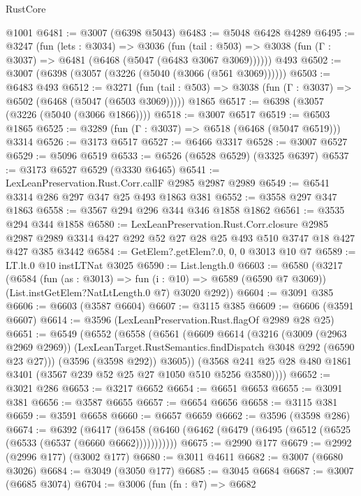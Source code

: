 \begin{lexlean}{RustCore}
\begin{coremodule}
    @1001
@6481 := @3007 (@6398 @5043)
@6483 := @5048 @6428 @4289
@6495 := @3247
    (fun (lets : @3034) =>
    @3036
      (fun (tail : @503) => @3038 (fun (Γ : @3037) => @6481 (@6468 (@5047 (@6483 @3067 @3069))))))
    @493
@6502 := @3007 (@6398 (@3057 (@3226 (@5040 (@3066 (@561 @3069))))))
@6503 := @6483 @493
@6512 := @3271
    (fun (tail : @503) => @3038 (fun (Γ : @3037) => @6502 (@6468 (@5047 (@6503 @3069)))))
    @1865
@6517 := @6398 (@3057 (@3226 (@5040 (@3066 @1866))))
@6518 := @3007 @6517
@6519 := @6503 @1865
@6525 := @3289 (fun (Γ : @3037) => @6518 (@6468 (@5047 @6519))) @3314
@6526 := @3173 @6517
@6527 := @6466 @3317
@6528 := @3007 @6527
@6529 := @5096 @6519
@6533 := @6526 (@6528 @6529) (@3325 @6397)
@6537 := @3173 @6527 @6529 (@3330 @6465)
@6541 := LexLeanPreservation.Rust.Corr.callF @2985 @2987 @2989
@6549 := @6541 @3314 @286 @297 @347 @25 @493 @1863 @381
@6552 := @3558 @297 @347 @1863
@6558 := @3567 @294 @296 @344 @346 @1858 @1862
@6561 := @3535 @294 @344 @1858
@6580 := LexLeanPreservation.Rust.Corr.closure
    @2985
    @2987
    @2989
    @3314
    @427
    @292
    @52
    @27
    @28
    @25
    @493
    @510
    @3747
    @18
    @427
    @427
    @385
    @3442
@6584 := GetElem?.getElem?.{0, 0, 0} @3013 @10 @7
@6589 := LT.lt.{0} @10 instLTNat @3025
@6590 := List.length.{0}
@6603 := @6580
    (@3217
      (@6584
        (fun (as : @3013) => fun (i : @10) => @6589 (@6590 @7 @3069))
        (List.instGetElem?NatLtLength.{0} @7)
        @3020
        @292))
@6604 := @3091 @385
@6606 := @6603 (@3587 @6604)
@6607 := @3115 @385
@6609 := @6606 (@3591 @6607)
@6614 := @3596 (LexLeanPreservation.Rust.flagOf @2989 @28 @25)
@6651 := @6549
    (@6552
      (@6558
        (@6561
          (@6609
            @6614
            (@3216
              (@3009 (@2963 @2969 @2969))
              (LexLeanTarget.RustSemantics.findDispatch @3048 @292 (@6590 @23 @27)))
            (@3596 (@3598 @292))
            @3605))
        (@3568 @241 @25 @28 @480 @1861 @3401 (@3567 @239 @52 @25 @27 @1050 @510 @5256 @3580))))
@6652 := @3021 @286
@6653 := @3217 @6652
@6654 := @6651 @6653
@6655 := @3091 @381
@6656 := @3587 @6655
@6657 := @6654 @6656
@6658 := @3115 @381
@6659 := @3591 @6658
@6660 := @6657 @6659
@6662 := @3596 (@3598 @286)
@6674 := @6392
    (@6417 (@6458 (@6460 (@6462 (@6479 (@6495 (@6512 (@6525 (@6533 (@6537 (@6660 @6662)))))))))))
@6675 := @2990 @177
@6679 := @2992 (@2996 @177) (@3002 @177)
@6680 := @3011 @4611
@6682 := @3007 (@6680 @3026)
@6684 := @3049 (@3050 @177)
@6685 := @3045 @6684
@6687 := @3007 (@6685 @3074)
@6704 := @3006
    (fun (fn : @7) =>
    @6682

\end{coremodule}
\end{lexlean}
